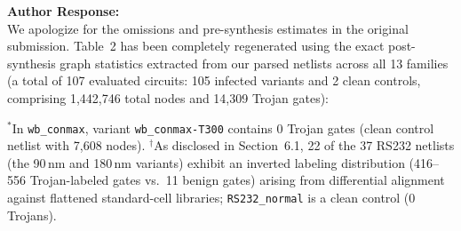 \documentclass[11pt,a4paper]{article}
\newcommand{\authorresponse}{\noindent\textbf{Author Response:}}
\begin{document}
\authorresponse\\
We apologize for the omissions and pre-synthesis estimates in the original submission. Table~2 has been completely regenerated using the exact post-synthesis graph statistics extracted from our parsed netlists across all 13 families (a total of 107 evaluated circuits: 105 infected variants and 2 clean controls, comprising 1,442,746 total nodes and 14,309 Trojan gates):

\begin{table}[htbp]
\centering
\caption{Revised Table 2: Exact Post-Synthesis Graph Statistics Across All 13 Circuit Families}
\label{tab:dataset_revised}
\vspace{4pt}
\end{table}

{\small $^*$In \texttt{wb\_conmax}, variant \texttt{wb\_conmax-T300} contains 0 Trojan gates (clean control netlist with 7,608 nodes).  
$^\dagger$As disclosed in Section~6.1, 22 of the 37 RS232 netlists (the 90\,nm and 180\,nm variants) exhibit an inverted labeling distribution (416--556 Trojan-labeled gates vs.\ 11 benign gates) arising from differential alignment against flattened standard-cell libraries; \texttt{RS232\_normal} is a clean control (0 Trojans).}
\end{document}
